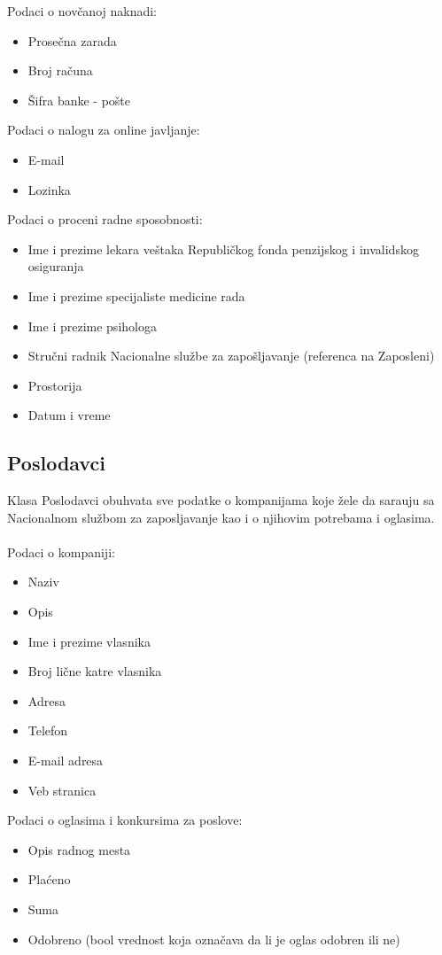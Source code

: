 \noindent Podaci o nov\v canoj naknadi:
\begin{itemize}
	\item Prose\v cna zarada
	\item Broj ra\v cuna
	\item \v Sifra banke - po\v ste
\end{itemize}

\noindent Podaci o nalogu za online javljanje:
\begin{itemize}
	\item E-mail
	\item Lozinka
\end{itemize}

\noindent Podaci o proceni radne sposobnosti:
\begin{itemize}
	\item Ime i prezime lekara veštaka Republi\v ckog fonda penzijskog i invalidskog osiguranja
	\item Ime i prezime specijaliste medicine rada
	\item Ime i prezime psihologa
	\item Stru\v cni radnik Nacionalne slu\v zbe za zapo\v sljavanje (referenca na Zaposleni)
	\item Prostorija
	\item Datum i vreme
\end{itemize}


\subsection{Poslodavci}
Klasa Poslodavci obuhvata sve podatke o kompanijama koje \v zele da sara\dj uju sa Nacionalnom slu\v zbom za zaposljavanje kao i o njihovim potrebama i oglasima.
\\
\\ Podaci o kompaniji:
\begin{itemize}
	\item Naziv
	\item Opis
	\item Ime i prezime vlasnika
	\item Broj li\v cne katre vlasnika
	\item Adresa
	\item Telefon
	\item E-mail adresa
	\item Veb stranica
\end{itemize}

\noindent Podaci o oglasima i konkursima za poslove:
\begin{itemize}
	\item Opis radnog mesta
	\item Pla\' ceno
	\item Suma
	\item Odobreno (bool vrednost koja ozna\v cava da li je oglas odobren ili ne)
\end{itemize}


